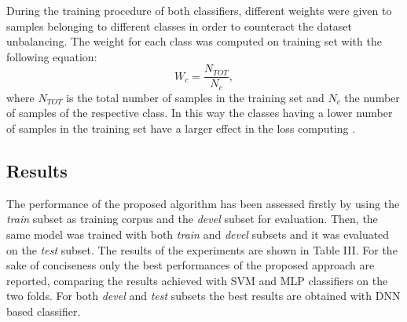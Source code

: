 During the training procedure of both classifiers, different weights were given to samples belonging to different classes in order to counteract the dataset unbalancing. The weight for each class was computed on training set with the following equation:
\begin{equation}
W_c = \frac{N_{TOT}}{N_c},
\end{equation}
where $N_{TOT}$ is the total number of samples in the training set and $N_c$ the number of samples of the respective class. In this way the classes having a lower number of samples in the training set have a larger effect in the loss computing \cite{king2001logistic}. 

\subsection{Results}

The performance of the proposed algorithm has been assessed firstly by using the \textit{train} subset as training corpus and the \textit{devel} subset for evaluation. Then, the same model was trained with both \textit{train} and \textit{devel} subsets and it was evaluated on the \textit{test} subset. The results of the experiments are shown in Table III. For the sake of conciseness  only the best performances of the proposed approach are reported, comparing the results achieved with SVM and MLP classifiers on the two folds. For both \textit{devel} and \textit{test} subsets the best results are obtained with DNN based classifier.

